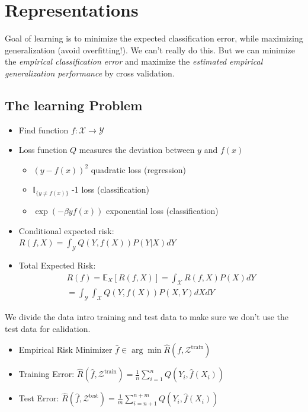 \section{Representations}
Goal of learning is to minimize the expected classification error, while maximizing generalization (avoid overfitting!).
We can't really do this. But we can minimize the \textit{empirical classification error} and maximize the \textit{estimated empirical generalization performance} by cross validation.

\subsection{The learning Problem}
\begin{itemize}
	\item Find function $f : \mathcal{X} \rightarrow \mathcal{Y}$ 
	\item Loss function $Q$ measures the deviation between $y$ and $f(x)$
	\begin{itemize}
		\item $(y-f(x))^2$ \quad  quadratic loss (regression)
		\item $\mathbb{I}_{\{y\neq f(x)\}}$ -1 loss (classification)
		\item $\exp{(-\beta yf(x))}$ \quad  exponential loss (classification)
	\end{itemize}
	\item Conditional expected risk: \\$R(f,X) = \int_\mathcal{Y} Q(Y, f(X))P(Y|X)dY$
	\item Total Expected Risk: 
	\begin{multline*}
		R(f) = \mathbb{E}_X\left[R(f,X)\right]  = \int_\mathcal{X} R(f, X)P(X)dY\\ 
		= \int_\mathcal{Y} \int_\mathcal{X} Q(Y, f(X))P(X, Y)dXdY
	\end{multline*}
\end{itemize}

We divide the data intro training and test data to make sure we don't use the test data for calidation.
\begin{itemize}
	\item Empirical Risk Minimizer $\hat f \in \arg \min \hat R(f, \mathcal{Z}^{\text{train}})$ 
	\item Training Error: $\hat R(\hat f, \mathcal{Z}^\text{train}) = \frac{1}{n}\sum_{i=1}^n Q(Y_i, \hat f(X_i))$ 
	\item Test Error: $\hat R(\hat f, \mathcal{Z}^\text{test}) = \frac{1}{m}\sum_{i=n+1}^{n+m} Q(Y_i, \hat f(X_i))$
\end{itemize}

